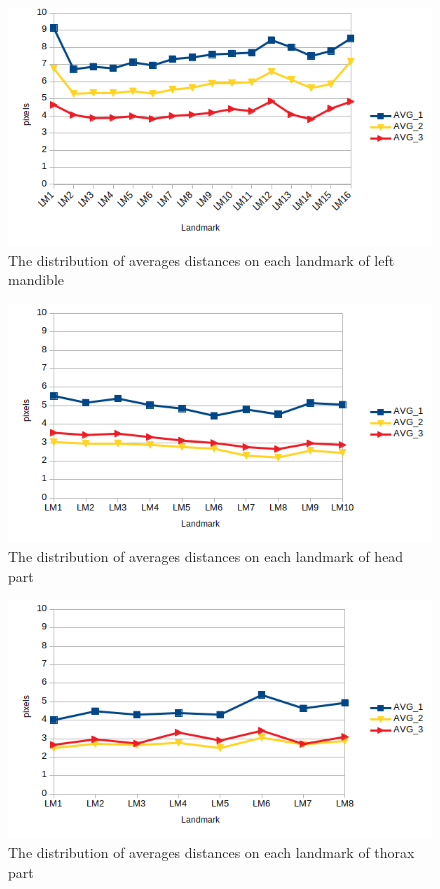 \documentclass[12pt, a4paper]{article}
\begin{document}
\begin{figure}[h]
	\caption{The distribution of averages distances on each landmark of left mandible}
	\centering
	\includegraphics[scale=.71]{images/5parts/mg.png}
\end{figure}

\begin{figure}[!h]
	\caption{The distribution of averages distances on each landmark of head part}
	\centering
	\includegraphics[scale=.8]{images/5parts/tete.png}
\end{figure}

\begin{figure}[!h]
	\caption{The distribution of averages distances on each landmark of thorax part}
	\centering
	\includegraphics[scale=.8]{images/5parts/pronotum.png}
\end{figure}
\end{document}
